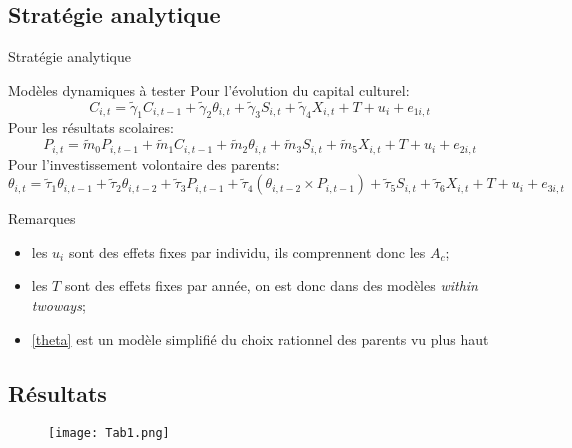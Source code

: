\documentclass[9pt]{beamer}
\begin{document}
\subsection{Stratégie analytique}
\begin{frame}{Stratégie analytique}
	\begin{block}{Modèles dynamiques à tester}
	Pour l'évolution du capital culturel:
		\begin{equation}
		C_{i,t}=\tilde{\gamma}_1C_{i,t-1}+\tilde{\gamma}_2\theta_{i,t}+\tilde{\gamma}_3S_{i,t}+\tilde{\gamma}_4X_{i,t}+T+u_i+e_{1i,t}\label{C}
		\end{equation}
	Pour les résultats scolaires:
		\begin{equation}
		P_{i,t} = \tilde{m}_0P_{i,t-1}+\tilde{m}_1C_{i,t-1}+\tilde{m}_2\theta_{i,t}+\tilde{m}_3S_{i,t}+\tilde{m}_5X_{i,t}+T+u_i+e_{2i,t}\label{P}
		\end{equation}
	Pour l'investissement volontaire des parents:
		\begin{equation}
		\theta_{i,t}= \tilde{\tau}_1\theta_{i,t-1}+\tilde{\tau}_2\theta_{i,t-2}+\tilde{\tau}_3P_{i,t-1}+\tilde{\tau}_4(\theta_{i,t-2}\times P_{i,t-1})+\tilde{\tau}_5S_{i,t}+\tilde{\tau}_6X_{i,t}+T+u_i+e_{3i,t}\label{theta}
		\end{equation}
	\end{block}
	\begin{alertblock}{Remarques}
		\begin{itemize}
		\item les $u_i$ sont des effets fixes par individu, ils comprennent donc les $A_c$;
		\item les $T$ sont des effets fixes par année, on est donc dans des modèles \textit{within twoways};
		\item \eqref{theta} est un modèle simplifié du choix rationnel des parents vu plus haut
		\end{itemize}
	\end{alertblock}
\end{frame}

\subsection{Résultats}
\begin{frame}
	\begin{figure}[h]
		\begin{center}
		\texttt{[image: Tab1.png]}
		\end{center}
	\end{figure}
\end{frame}
\end{document}
